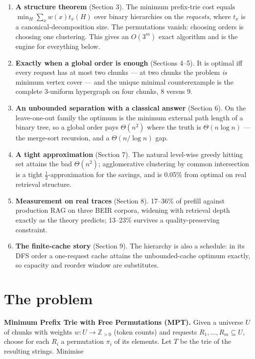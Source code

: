 \documentclass[11pt]{article}
\theoremstyle{plain}
\begin{document}
\begin{enumerate}
\item \textbf{A structure theorem} (Section 3). The minimum prefix-trie cost equals $\min_H \sum_x w(x) t_x(H)$ over binary hierarchies on the \emph{requests}, where $t_x$ is a canonical-decomposition size. The permutations vanish: choosing orders is choosing one clustering. This gives an $O(3^m)$ exact algorithm and is the engine for everything below.
\item \textbf{Exactly when a global order is enough} (Sections 4--5). It is optimal iff every request has at most two chunks --- at two chunks the problem \emph{is} minimum vertex cover --- and the unique minimal counterexample is the complete 3-uniform hypergraph on four chunks, 8 versus 9.
\item \textbf{An unbounded separation with a classical answer} (Section 6). On the leave-one-out family the optimum is the minimum external path length of a binary tree, so a global order pays $\Theta(n^2)$ where the truth is $\Theta(n\log n)$ --- the merge-sort recursion, and a $\Theta(n/\log n)$ gap.
\item \textbf{A tight approximation} (Section 7). The natural level-wise greedy hitting set attains the bad $\Theta(n^2)$; agglomerative clustering by common intersection is a tight $\tfrac12$-approximation for the savings, and is 0.05\% from optimal on real retrieval structure.
\item \textbf{Measurement on real traces} (Section 8). 17--36\% of prefill against production RAG on three BEIR corpora, widening with retrieval depth exactly as the theory predicts; 13--23\% survives a quality-preserving constraint.
\item \textbf{The finite-cache story} (Section 9). The hierarchy is also a schedule: in its DFS order a one-request cache attains the unbounded-cache optimum exactly, so capacity and reorder window are substitutes.
\end{enumerate}


\section{The problem}

\textbf{Minimum Prefix Trie with Free Permutations (MPT).} Given a universe $U$ of chunks with weights $w:U\to\mathbb{Z}_{>0}$ (token counts) and requests $R_1,\dots,R_m \subseteq U$, choose for each $R_i$ a permutation $\pi_i$ of its elements. Let $T$ be the trie of the resulting strings. Minimise
\end{document}
